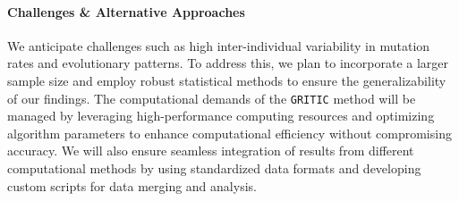 
\paragraph{Challenges \& Alternative Approaches}

We anticipate challenges such as high inter-individual variability in mutation rates and evolutionary patterns. To address this, we plan to incorporate a larger sample size and employ robust statistical methods to ensure the generalizability of our findings. The computational demands of the \texttt{GRITIC} method will be managed by leveraging high-performance computing resources and optimizing algorithm parameters to enhance computational efficiency without compromising accuracy. We will also ensure seamless integration of results from different computational methods by using standardized data formats and developing custom scripts for data merging and analysis.